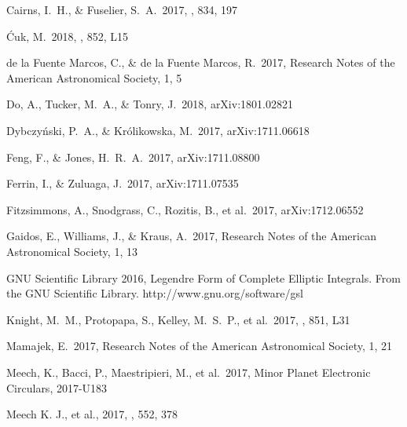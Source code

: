 \documentclass[a4paper,fleqn,usenatbib]{mnras}
\begin{document}
\begin{thebibliography}{99}

 Cairns, I.~H., \& Fuselier, S.~A.\ 2017, \apj, 834, 197

 {\'C}uk, M.\ 2018, \apjl, 852, L15

 de la Fuente Marcos, C., \& de la Fuente Marcos, R.\ 2017, Research Notes of the American Astronomical Society, 1, 5

 Do, A., Tucker, M.~A., \& Tonry, J.\ 2018, arXiv:1801.02821

 Dybczy{\'n}ski, P.~A., \& Kr{\'o}likowska, M.\ 2017, arXiv:1711.06618

 Feng, F., \& Jones, H.~R.~A.\ 2017, arXiv:1711.08800

 Ferrin, I., \& Zuluaga, J.\ 2017, arXiv:1711.07535

 Fitzsimmons, A., Snodgrass, C., Rozitis, B., et al.\ 2017, arXiv:1712.06552

 Gaidos, E., Williams, J., \& Kraus, A.\ 2017, Research Notes of the American Astronomical Society, 1, 13

 GNU Scientific Library 2016, Legendre Form of Complete Elliptic Integrals. From the GNU Scientific Library. http://www.gnu.org/software/gsl

 Knight, M.~M., Protopapa, S., Kelley, M.~S.~P., et al.\ 2017, \apjl, 851, L31 

 Mamajek, E.\ 2017, Research Notes of the American Astronomical Society, 1, 21 

 Meech, K., Bacci, P., Maestripieri, M., et al.\ 2017, Minor Planet Electronic Circulars, 2017-U183

 Meech K. J., et al., 2017, \nat, 552, 378


\end{thebibliography}
\end{document}
